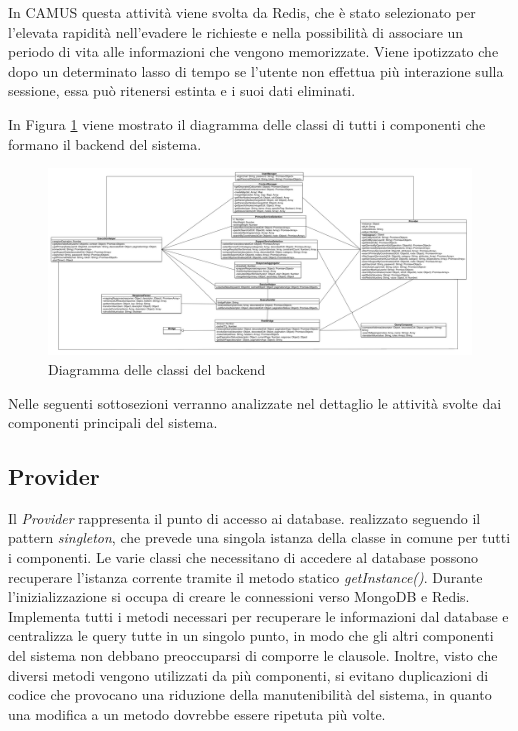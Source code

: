 In CAMUS questa attività viene svolta da Redis, che è stato selezionato per l'elevata rapidità nell'evadere le richieste e nella possibilità di associare un periodo di vita alle informazioni che vengono memorizzate. Viene ipotizzato che dopo un determinato lasso di tempo se l'utente non effettua più interazione sulla sessione, essa può ritenersi estinta e i suoi dati eliminati.

In Figura \ref{fig:class-diagram-backend} viene mostrato il diagramma delle classi di tutti i componenti che formano il backend del sistema.

\begin{figure}[ht]
	\hspace*{-2.2cm}
	\centering
	\includegraphics[width=1.4\textwidth]{5-implementazione-backend/Immagini/diagramma_classi_backend.png}
	\caption{Diagramma delle classi del backend}\label{fig:class-diagram-backend}
\end{figure}

Nelle seguenti sottosezioni verranno analizzate nel dettaglio le attività svolte dai componenti principali del sistema.

\subsection{Provider\label{sec:provider}}

Il \emph{Provider} rappresenta il punto di accesso ai database. \upe realizzato seguendo il pattern \emph{singleton}, che prevede una singola istanza della classe in comune per tutti i componenti. Le varie classi che necessitano di accedere al database possono recuperare l'istanza corrente tramite il metodo statico \emph{getInstance()}. Durante l'inizializzazione si occupa di creare le connessioni verso MongoDB e Redis. Implementa tutti i metodi necessari per recuperare le informazioni dal database e centralizza le query tutte in un singolo punto, in modo che gli altri componenti del sistema non debbano preoccuparsi di comporre le clausole. Inoltre, visto che diversi metodi vengono utilizzati da più componenti, si evitano duplicazioni di codice che provocano una riduzione della manutenibilità del sistema, in quanto una modifica a un metodo dovrebbe essere ripetuta più volte.

